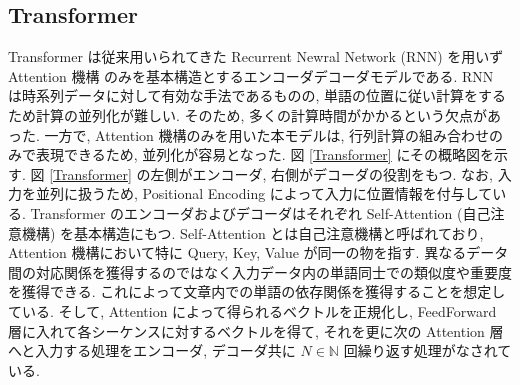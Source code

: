 \subsection{Transformer}

Transformer \cite{Transformer} は従来用いられてきた Recurrent Newral Network (RNN) \cite{RNN} を用いず Attention 機構 \cite{Attention} のみを基本構造とするエンコーダデコーダモデルである. RNN は時系列データに対して有効な手法であるものの, 単語の位置に従い計算をするため計算の並列化が難しい. そのため, 多くの計算時間がかかるという欠点があった. 一方で, Attention 機構のみを用いた本モデルは, 行列計算の組み合わせのみで表現できるため, 並列化が容易となった. 図 \ref{Transformer} にその概略図を示す. 図 \ref{Transformer} の左側がエンコーダ, 右側がデコーダの役割をもつ. なお, 入力を並列に扱うため, Positional Encoding によって入力に位置情報を付与している. Transformer のエンコーダおよびデコーダはそれぞれ Self-Attention (自己注意機構) を基本構造にもつ. Self-Attention とは自己注意機構と呼ばれており, Attention 機構において特に Query, Key, Value が同一の物を指す. 異なるデータ間の対応関係を獲得するのではなく入力データ内の単語同士での類似度や重要度を獲得できる. これによって文章内での単語の依存関係を獲得することを想定している. そして, Attention によって得られるベクトルを正規化し, FeedForward 層に入れて各シーケンスに対するベクトルを得て, それを更に次の Attention 層へと入力する処理をエンコーダ, デコーダ共に $N \in \mathbb{N}$ 回繰り返す処理がなされている. \par

